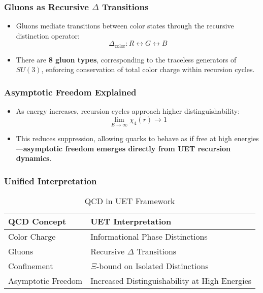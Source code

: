 \documentclass[12pt,a4paper]{article}
\begin{document}
\subsubsection*{Gluons as Recursive \(\Delta\) Transitions}

\begin{itemize}
    \item Gluons mediate transitions between color states through the recursive distinction operator:
    \[
    \Delta_{\text{color}}: R \leftrightarrow G \leftrightarrow B
    \]
    \item There are \textbf{8 gluon types}, corresponding to the traceless generators of \(SU(3)\), enforcing conservation of total color charge within recursion cycles.
\end{itemize}

\subsubsection*{Asymptotic Freedom Explained}

\begin{itemize}
    \item As energy increases, recursion cycles approach higher distinguishability:
    \[
    \lim_{E \to \infty} \chi_4(r) \to 1
    \]
    \item This reduces suppression, allowing quarks to behave as if free at high energies—\textbf{asymptotic freedom emerges directly from UET recursion dynamics}.
\end{itemize}

\subsubsection*{Unified Interpretation}

\begin{table}[h]
\centering
\begin{tabular}{|l|l|}
\hline
\textbf{QCD Concept} & \textbf{UET Interpretation} \\
\hline
Color Charge & Informational Phase Distinctions \\
Gluons & Recursive \(\Delta\) Transitions \\
Confinement & \(\Xi\)-bound on Isolated Distinctions \\
Asymptotic Freedom & Increased Distinguishability at High Energies \\
\hline
\end{tabular}
\caption{QCD in UET Framework}
\end{table}
\end{document}

